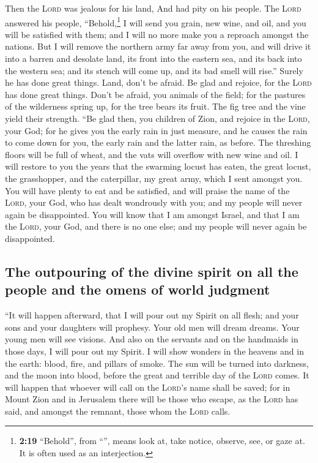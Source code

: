  Then the \textsc{Lord} was jealous for his land, And had
pity on his people.  The \textsc{Lord} answered his
people, ``Behold,\footnote{\textbf{2:19} ``Behold'', from
  ``'', means look at, take notice, observe, see, or gaze
  at. It is often used as an interjection.} I will send you grain, new
wine, and oil, and you will be satisfied with them; and I will no more
make you a reproach amongst the nations.  But I will
remove the northern army far away from you, and will drive it into a
barren and desolate land, its front into the eastern sea, and its back
into the western sea; and its stench will come up, and its bad smell
will rise.'' Surely he has done great things.  Land,
don't be afraid. Be glad and rejoice, for the \textsc{Lord} has done
great things.  Don't be afraid, you animals of the field;
for the pastures of the wilderness spring up, for the tree bears its
fruit. The fig tree and the vine yield their strength. 
``Be glad then, you children of Zion, and rejoice in the \textsc{Lord},
your God; for he gives you the early rain in just measure, and he causes
the rain to come down for you, the early rain and the latter rain, as
before.  The threshing floors will be full of wheat, and
the vats will overflow with new wine and oil.  I will
restore to you the years that the swarming locust has eaten, the great
locust, the grasshopper, and the caterpillar, my great army, which I
sent amongst you.  You will have plenty to eat and be
satisfied, and will praise the name of the \textsc{Lord}, your God, who
has dealt wondrously with you; and my people will never again be
disappointed.  You will know that I am amongst Israel,
and that I am the \textsc{Lord}, your God, and there is no one else; and
my people will never again be disappointed.

\hypertarget{the-outpouring-of-the-divine-spirit-on-all-the-people-and-the-omens-of-world-judgment}{%
\subsection{The outpouring of the divine spirit on all the people and
the omens of world
judgment}\label{the-outpouring-of-the-divine-spirit-on-all-the-people-and-the-omens-of-world-judgment}}

 ``It will happen afterward, that I will pour out my
Spirit on all flesh; and your sons and your daughters will prophesy.
Your old men will dream dreams. Your young men will see visions.
 And also on the servants and on the handmaids in those
days, I will pour out my Spirit.  I will show wonders in
the heavens and in the earth: blood, fire, and pillars of smoke.
 The sun will be turned into darkness, and the moon into
blood, before the great and terrible day of the \textsc{Lord} comes.
 It will happen that whoever will call on the
\textsc{Lord}'s name shall be saved; for in Mount Zion and in Jerusalem
there will be those who escape, as the \textsc{Lord} has said, and
amongst the remnant, those whom the \textsc{Lord} calls.

